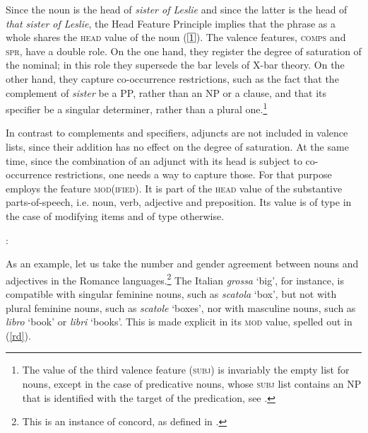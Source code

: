 \documentclass[output=paper
                ,modfonts
                ,nonflat
	        ,collection
	        ,collectionchapter
	        ,collectiontoclongg
 	        ,biblatex
                ,babelshorthands
                ,newtxmath
                ,draftmode
                ,colorlinks, citecolor=brown
]{./langsci/langscibook}
\begin{document}
Since the noun is the head of \emph{sister of Leslie} and since the latter is 
the head of \emph{that sister of Leslie}, the Head Feature Principle implies 
that the phrase as a whole shares the \textsc{head} value of the noun ($\avmbox{1}$). 
The valence features, \textsc{comps} and \textsc{spr}, have a double role. 
On the one hand, they register the degree of saturation of the nominal; 
in this role they supersede the bar levels of X-bar theory. 
On the other hand, they capture co-occurrence restrictions, 
such as the fact that the complement of \emph{sister} be a PP, rather than an NP or a clause, 
and that its specifier be a singular determiner, rather than a plural one.\footnote{The 
value of the third valence feature (\textsc{subj}) is invariably the empty list for nouns, 
except in the case of predicative nouns, whose \textsc{subj} list contains an NP 
that is identified with the target of the predication, see \citet[409]{GS00}.}

In contrast to complements and specifiers, adjuncts are not included in valence lists, 
since their addition has no effect on the degree of saturation. At the same time, 
since the combination of an adjunct with its head is subject to 
co-occurrence restrictions, one needs a way to capture those. 
For that purpose \citet[55--57]{ps2} employs the feature \textsc{mod(ified)}. 
It is part of the \textsc{head} value of the substantive parts-of-speech, 
i.e. noun, verb, adjective and preposition. Its value is of type  
in the case of modifying items and of type  otherwise.

\begin{exe} 
\ex   {}: \begin{avm} 
                          \end{avm} 
\end{exe} 

\noindent
As an example, let us take the number and gender agreement 
between nouns and adjectives in the Romance languages.\footnote{This is an 
instance of concord, as defined in .}  
The Italian \emph{grossa} `big', for instance, 
is compatible with singular feminine nouns, such as \emph{scatola} `box', 
but not with plural feminine nouns, such as \emph{scatole} `boxes', nor
with masculine nouns, such as \emph{libro} `book' or \emph{libri} `books'. 
This is made explicit in its \textsc{mod} value, spelled out in (\ref{rd}). 
\end{document}
